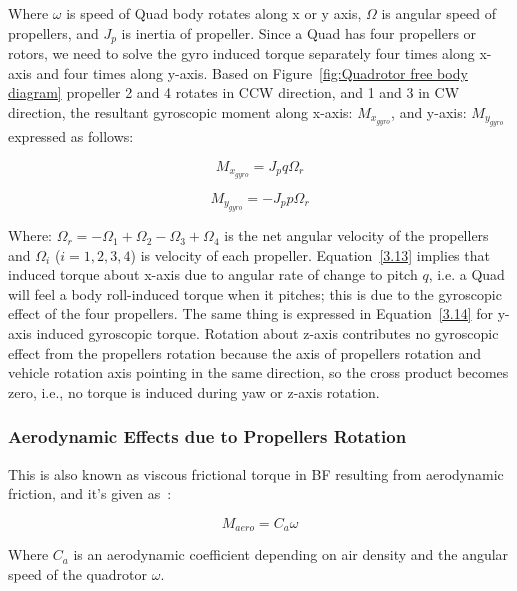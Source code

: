 Where $\omega$ is speed of Quad body rotates along x or y axis, $\Omega$ is angular speed of propellers,
and $J_p$ is inertia of propeller. Since a Quad has four propellers or rotors, we need to solve the
gyro induced torque separately four times along x-axis and four times along y-axis. Based on
Figure~\ref{fig:Quadrotor free body diagram} propeller 2 and 4 rotates in CCW direction, and 1 and 3 in CW direction, the resultant
gyroscopic moment along x-axis: $M_{x_{gyro}}$, and y-axis: $M_{y_{gyro}}$ expressed as follows:

\begin{equation}
    M_{x_{gyro}} = J_p q \Omega_r %
    \label{3.13}
\end{equation}

\begin{equation}
    M_{y_{gyro}} = -J_p p \Omega_r %
    \label{3.14}
\end{equation}

Where: $\Omega_r = -\Omega_1 + \Omega_2 - \Omega_3 + \Omega_4$ is the net angular velocity of the
propellers and $\Omega_i$ ($i=1,2,3,4$) is velocity of each propeller. Equation~\eqref{3.13} implies that
induced torque about x-axis due to angular rate of change to pitch $q$, i.e. a Quad will feel a body
roll-induced torque when it pitches; this is due to the gyroscopic effect of the four propellers.
The same thing is expressed in Equation~\eqref{3.14} for y-axis induced gyroscopic torque. Rotation about
z-axis contributes no gyroscopic effect from the propellers rotation because the axis of propellers
rotation and vehicle rotation axis pointing in the same direction, so the cross product becomes zero,
i.e., no torque is induced during yaw or z-axis rotation.

\subsubsection{Aerodynamic Effects due to Propellers Rotation}

This is also known as viscous frictional torque in BF resulting from aerodynamic friction, 
and it’s given as~\cite{bensalah2019full}:

\begin{equation}
    M_{aero} = C_a \omega %
    \label{3.15}
\end{equation}

Where $C_a$ is an aerodynamic coefficient depending on air density and the angular speed of the
quadrotor $\omega$.

